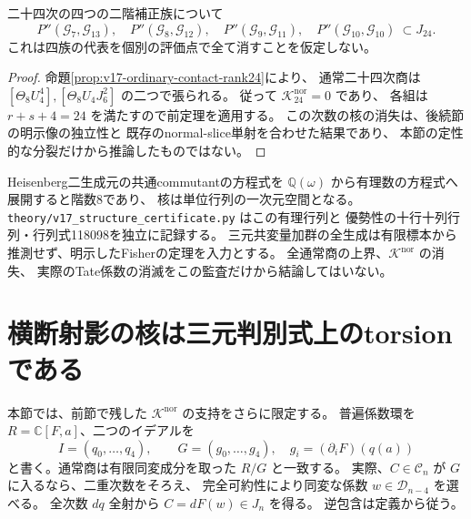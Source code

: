 \begin{corollary}[二十四次の全二階補正の通常像所属]
\label{cor:v17-twentyfourth-corrections-conditional}
二十四次の四つの二階補正族について
\[
 P''(\mathcal G_7,\mathcal G_{13}),\quad
 P''(\mathcal G_8,\mathcal G_{12}),\quad
 P''(\mathcal G_9,\mathcal G_{11}),\quad
 P''(\mathcal G_{10},\mathcal G_{10})
 \ \subset J_{24}.
\]
これは四族の代表を個別の評価点で全て消すことを仮定しない。
\end{corollary}

\begin{proof}
命題\ref{prop:v17-ordinary-contact-rank24}により、
通常二十四次商は $[\Theta_8U_4^4],[\Theta_8U_4J_6^2]$ の二つで張られる。
従って $\mathcal K_{24}^{\mathrm{nor}}=0$ であり、
各組は $r+s+4=24$ を満たすので前定理を適用する。
この次数の核の消失は、後続節の明示像の独立性と
既存のnormal-slice単射を合わせた結果であり、
本節の定性的な分裂だけから推論したものではない。
\end{proof}

\begin{remark}[証明と有限監査の範囲]
Heisenberg二生成元の共通commutantの方程式を
$\mathbb Q(\omega)$ から有理数の方程式へ展開すると階数8であり、
核は単位行列の一次元空間となる。
\nolinkurl{theory/v17_structure_certificate.py} はこの有理行列と
優勢性の十行十列行列・行列式118098を独立に記録する。
三元共変量加群の全生成は有限標本から推測せず、明示したFisherの定理を入力とする。
全通常商の上界、$\mathcal K^{\mathrm{nor}}$ の消失、
実際のTate係数の消滅をこの監査だけから結論してはいない。
\end{remark}




\section{横断射影の核は三元判別式上のtorsionである}
\label{sec:v17-discriminant-torsion}

本節では、前節で残した $\mathcal K^{\mathrm{nor}}$ の支持をさらに限定する。
普遍係数環を $R=\mathbb C[F,a]$、二つのイデアルを
\[
 I=(q_0,\ldots,q_4),\qquad G=(g_0,\ldots,g_4),\quad
 g_i=(\partial_iF)(q(a))
\]
と書く。通常商は有限同変成分を取った $R/G$ と一致する。
実際、$C\in\mathcal C_n$ が $G$ に入るなら、二重次数をそろえ、
完全可約性により同変な係数 $w\in\mathcal D_{n-4}$ を選べる。
全次数 $dq$ 全射から $C=dF(w)\in J_n$ を得る。
逆包含は定義から従う。

